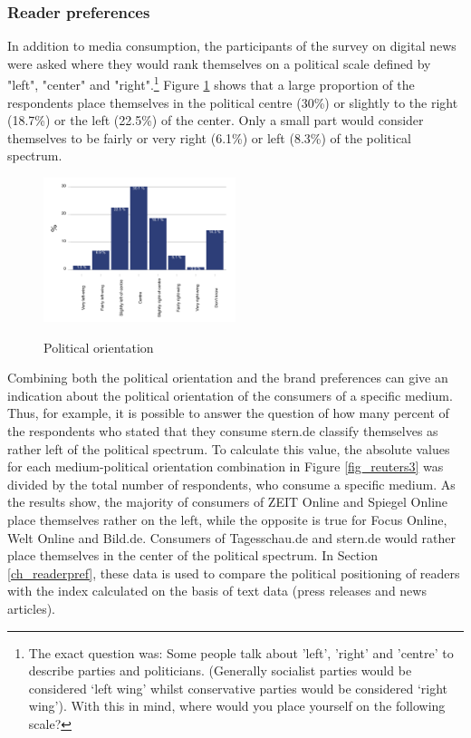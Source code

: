 \documentclass[12pt,a4paper,notitlepage]{article}
\begin{document}
\subsubsection{Reader preferences}

In addition to media consumption, the participants of the  survey on digital news were asked where they would rank themselves on a political scale defined by "left", "center" and "right".\footnote{The exact question was: Some people talk about 'left', 'right' and 'centre' to describe parties and politicians. (Generally socialist parties would be considered ‘left wing’ whilst conservative parties would be considered ‘right wing’). With this in mind, where would you place yourself on the following scale?} Figure \ref{fig_reuters2} shows that a large proportion of the respondents place themselves in the political centre (30\%) or slightly to the right (18.7\%) or the left (22.5\%) of the center. Only a small part would consider themselves to be fairly or very right (6.1\%) or left (8.3\%) of the political spectrum.

\begin{figure}[H]
\begin{center}
	\caption{Political orientation }
	\includegraphics[width=0.5\textwidth]{../figs/reuters2}
	\label{fig_reuters2}
	\end{center}
\end{figure}

Combining both the political orientation and the brand preferences can give an indication about the political orientation of the consumers of a specific medium. Thus, for example, it is possible to answer the question of how many percent of the respondents who stated that they consume stern.de classify themselves as rather left of the political spectrum. To calculate this value, the absolute values for each medium-political orientation combination in Figure \ref{fig_reuters3} was divided by the total number of respondents, who consume a specific medium. As the results show, the majority of consumers of ZEIT Online and Spiegel Online place themselves rather on the left, while the opposite is true for Focus Online, Welt Online and Bild.de. Consumers of Tagesschau.de and stern.de would rather place themselves in the center of the political spectrum. In Section \ref{ch_readerpref}, these data is used to compare the political positioning of readers with the index calculated on the basis of text data (press releases and news articles).
\end{document}
